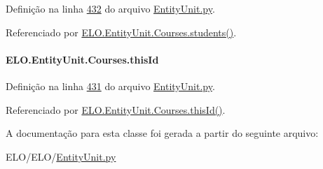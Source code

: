 Definição na linha \hyperlink{EntityUnit_8py_source_l00432}{432} do arquivo \hyperlink{EntityUnit_8py_source}{Entity\-Unit.\-py}.



Referenciado por \hyperlink{classELO_1_1EntityUnit_1_1Courses_ab1a0895decc2986339e0ab148922ad61}{E\-L\-O.\-Entity\-Unit.\-Courses.\-students()}.

\hypertarget{classELO_1_1EntityUnit_1_1Courses_a283b817d129a8d15e3bce56b368a169d}{
\paragraph[{this\-Id}]{\setlength{\rightskip}{0pt plus 5cm}E\-L\-O.\-Entity\-Unit.\-Courses.\-this\-Id}}\label{classELO_1_1EntityUnit_1_1Courses_a283b817d129a8d15e3bce56b368a169d}


Definição na linha \hyperlink{EntityUnit_8py_source_l00431}{431} do arquivo \hyperlink{EntityUnit_8py_source}{Entity\-Unit.\-py}.



Referenciado por \hyperlink{classELO_1_1EntityUnit_1_1Courses_a079f341a80c13005aec8764266f5c2f2}{E\-L\-O.\-Entity\-Unit.\-Courses.\-this\-Id()}.



A documentação para esta classe foi gerada a partir do seguinte arquivo\-:\begin{DoxyCompactItemize}
\item 
E\-L\-O/\-E\-L\-O/\hyperlink{EntityUnit_8py}{Entity\-Unit.\-py}\end{DoxyCompactItemize}
